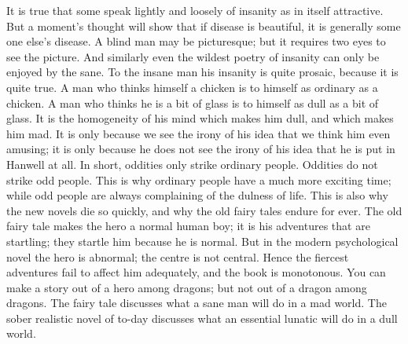 It is true that some speak lightly and loosely of insanity as in itself attractive. But a moment’s thought will show that if disease is beautiful, it is generally some one else’s disease. A blind man may be picturesque; but it requires two eyes to see the picture. And similarly even the wildest poetry of insanity can only be enjoyed by the sane. To the insane man his insanity is quite prosaic, because it is quite true. A man who thinks himself a chicken is to himself as ordinary as a chicken. A man who thinks he is a bit of glass is to himself as dull as a bit of glass. It is the homogeneity of his mind which makes him dull, and which makes him mad. It is only because we see the irony of his idea that we think him even amusing; it is only because he does not see the irony of his idea that he is put in Hanwell at all. In short, oddities only strike ordinary people. Oddities do not strike odd people. This is why ordinary people have a much more exciting time; while odd people are always complaining of the dulness of life. This is also why the new novels die so quickly, and why the old fairy tales endure for ever. The old fairy tale makes the hero a normal human boy; it is his adventures that are startling; they startle him because he is normal. But in the modern psychological novel the hero is abnormal; the centre is not central. Hence the fiercest adventures fail to affect him adequately, and the book is monotonous. You can make a story out of a hero among dragons; but not out of a dragon among dragons. The fairy tale discusses what a sane man will do in a mad world. The sober realistic novel of to-day discusses what an essential lunatic will do in a dull world.

